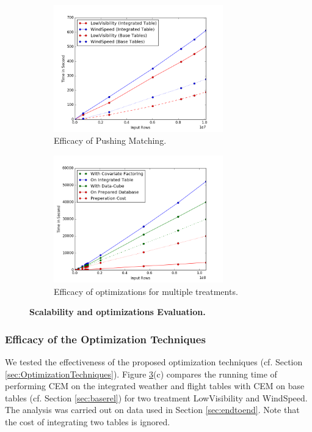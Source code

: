 \begin{figure}
\hspace*{-0.7cm}\begin{subfigure}{0.59\linewidth}
\centering
\includegraphics[height=5.5cm,width=1.02\linewidth]{Figures/opt1.png}
\caption{Efficacy of Pushing Matching.}
\label{sfig:testbc}
\end{subfigure}\hfill
\hspace*{-0.5cm}\begin{subfigure}{0.59\linewidth}
\centering \vspace{0.4cm}
\includegraphics[height=5.5cm,width=1.02\linewidth]{Figures/push.png}
\caption{Efficacy of optimizations for multiple treatments.}
\label{sfig:testbd}
\end{subfigure}\hfill

\caption{\bf{Scalability and optimizations Evaluation.}}
\label{fig:perfresults}
\end{figure}






\vspace{-.25cm}
\subsubsection{Efficacy of the Optimization Techniques}
\label{sec:opt}
We tested the effectiveness of the proposed optimization techniques (cf. Section \ref{sec:OptimizationTechniques}). Figure \ref{fig:perfresults}(c) compares the running time of performing CEM on
the integrated weather and flight tables with CEM on base tables (cf. Section \ref{sec:baserel})
for two treatment LowVisibility and WindSpeed.  The analysis was carried out on data used in Section \ref{sec:endtoend}. Note that the cost of integrating two tables is ignored.


